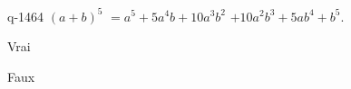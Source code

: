\begin{truefalse}{q-1464}
$(a+b)^5$ $=a^5+5a^4b+10a^3b^2$ $+10a^2b^3+5ab^4+b^5$.
\item* Vrai
\item Faux
\end{truefalse}

